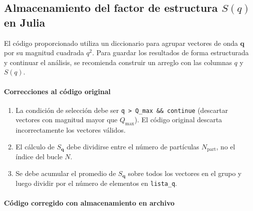 \documentclass{tufte-handout}
\begin{document}
\newpage
\subsection{Almacenamiento del factor de estructura $S(q)$ en Julia}

El código proporcionado utiliza un diccionario para agrupar vectores de onda $\mathbf{q}$ por su magnitud cuadrada $q^2$. Para guardar los resultados de forma estructurada y continuar el análisis, se recomienda construir un arreglo con las columnas $q$ y $S(q)$.

\paragraph*{Correcciones al código original}

\begin{enumerate}
    \item La condición de selección debe ser \texttt{q > Q\_max \&\& continue} (descartar vectores con magnitud mayor que $Q_{\text{max}}$). El código original descarta incorrectamente los vectores válidos.
    \item El cálculo de $S_{\mathbf{q}}$ debe dividirse entre el número de partículas $N_{\text{part}}$, no el índice del bucle $N$.
    \item Se debe acumular el promedio de $S_{\mathbf{q}}$ sobre todos los vectores en el grupo y luego dividir por el número de elementos en \texttt{lista\_q}.
\end{enumerate}

\paragraph*{Código corregido con almacenamiento en archivo}
\end{document}
